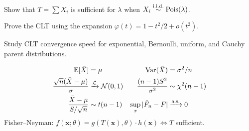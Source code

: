 \begin{exercise}
Show that $T=\sum X_i$ is sufficient for $\lambda$ when $X_i\overset{\text{i.i.d.}}{\sim}\mathrm{Pois}(\lambda)$.
\end{exercise}

\begin{exercise}
Prove the CLT using the expansion $\varphi(t)=1-t^2/2+o(t^2)$.
\end{exercise}

\begin{exercise}
Study CLT convergence speed for exponential, Bernoulli, uniform, and Cauchy parent distributions.
\end{exercise}

\begin{keyformulas}
\begin{align*}
\mathbb{E}[\bar{X}] &= \mu & \operatorname{Var}(\bar{X}) &= \sigma^2/n \\
\frac{\sqrt{n}(\bar{X}-\mu)}{\sigma} &\xrightarrow{\mathcal{L}} \mathcal{N}(0,1) &
\frac{(n-1)S^2}{\sigma^2} &\sim \chi^2(n-1) \\
\frac{\bar{X}-\mu}{S/\sqrt{n}} &\sim t(n-1) &
\sup_x|\hat{F}_n-F| &\xrightarrow{\text{a.s.}} 0
\end{align*}
Fisher--Neyman: $f(\mathbf{x};\theta) = g(T(\mathbf{x}),\theta)\cdot h(\mathbf{x}) \iff T$ sufficient.
\end{keyformulas}
